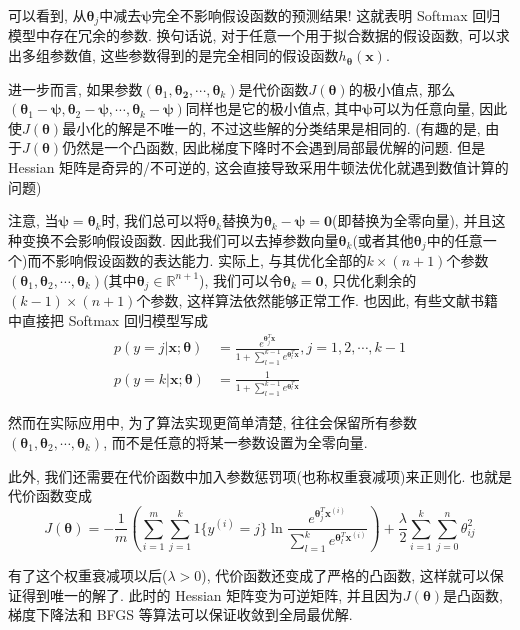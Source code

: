 \documentclass[a4paper,UTF8]{ctexart}
\theoremstyle{plain} \newtheorem{theorem}{定理}[section]
\theoremstyle{plain} \newtheorem{definition}{定义}[section]
\theoremstyle{plain} \newtheorem{lemma}{引理}[section]
\theoremstyle{plain} \newtheorem{proposition}{命题}[section]
\theoremstyle{plain} \newtheorem{example}{例}[section]
\theoremstyle{plain} \newtheorem{remark}{注}[section]
\theoremstyle{plain} \newtheorem{corollary}{推论}[section]
\begin{document}
可以看到, 从$\bm{\theta}_{j}$中减去$\bm{\psi}$完全不影响假设函数的预测结果! 这就表明 Softmax 回归模型中存在冗余的参数. 换句话说, 对于任意一个用于拟合数据的假设函数, 可以求出多组参数值, 这些参数得到的是完全相同的假设函数$h_{\bm{\theta}}(\bm{x})$.

进一步而言, 如果参数$(\bm{\theta}_1, \bm{\theta_2}, \cdots, \bm{\theta}_k)$是代价函数$J(\bm{\theta})$的极小值点, 那么$(\bm{\theta}_1 - \bm{\psi}, \bm{\theta}_2 - \bm{\psi}, \cdots, \bm{\theta}_k - \bm{\psi})$同样也是它的极小值点, 其中$\bm{\psi}$可以为任意向量, 因此使$J(\bm{\theta})$最小化的解是不唯一的, 不过这些解的分类结果是相同的. (有趣的是, 由于$J(\bm{\theta})$仍然是一个凸函数, 因此梯度下降时不会遇到局部最优解的问题. 但是 Hessian 矩阵是奇异的/不可逆的, 这会直接导致采用牛顿法优化就遇到数值计算的问题)

注意, 当$\bm{\psi} = \bm{\theta}_{k}$时, 我们总可以将$\bm{\theta}_{k}$替换为$\bm{\theta}_{k} - \bm{\psi} = \bm{0}$(即替换为全零向量), 并且这种变换不会影响假设函数. 因此我们可以去掉参数向量$\bm{\theta}_{k}$(或者其他$\bm{\theta}_{j}$中的任意一个)而不影响假设函数的表达能力. 实际上, 与其优化全部的$k \times (n+1)$个参数$(\bm{\theta}_1, \bm{\theta}_2, \cdots, \bm{\theta}_k)$(其中$\bm{\theta}_{j} \in \mathbb{R}^{n+1}$), 我们可以令$\bm{\theta}_{k} = \bm{0}$, 只优化剩余的$(k-1) \times (n+1)$个参数, 这样算法依然能够正常工作. 也因此, 有些文献书籍中直接把 Softmax 回归模型写成
\begin{align*}
p(y = j | \bm{x}; \bm{\theta}) & = \frac{e^{\bm{\theta}_{j}^{T} \bm{x} }} {1 + \sum_{l=1}^{k-1} e^{\bm{\theta}_{l}^{T} \bm{x} }} , j = 1, 2, \cdots, k-1 \\ 
p(y = k | \bm{x}; \bm{\theta}) & = \frac{1} {1 + \sum_{l=1}^{k-1} e^{\bm{\theta}_{l}^{T} \bm{x} }}
\end{align*}

然而在实际应用中, 为了算法实现更简单清楚, 往往会保留所有参数$(\bm{\theta}_1, \bm{\theta}_2, \cdots, \bm{\theta}_k)$, 而不是任意的将某一参数设置为全零向量. 

此外, 我们还需要在代价函数中加入参数惩罚项(也称权重衰减项)来正则化. 也就是代价函数变成
\begin{equation*}
J(\bm{\theta}) = - \frac{1}{m} \left( \sum_{i=1}^{m} \sum_{j=1}^{k} 1\{y^{(i)}=j\} \ln \frac{e^{\bm{\theta}_{j}^T \bm{x}^{(i)}}}{\sum_{l=1}^{k} e^{\bm{\theta}_{l}^T \bm{x}^{(i)}}} \right) + \frac{\lambda}{2} \sum_{i=1}^{k} \sum_{j=0}^{n} \theta_{ij}^{2}
\end{equation*}

有了这个权重衰减项以后($\lambda > 0$), 代价函数还变成了严格的凸函数, 这样就可以保证得到唯一的解了. 此时的 Hessian 矩阵变为可逆矩阵, 并且因为$J(\bm{\theta})$是凸函数, 梯度下降法和 BFGS 等算法可以保证收敛到全局最优解.
\end{document}
